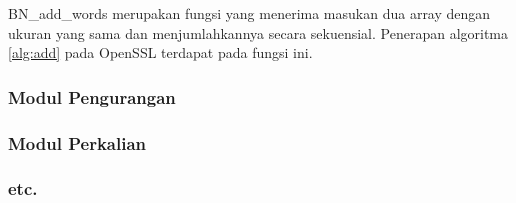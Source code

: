 BN\_add\_words merupakan fungsi yang menerima masukan dua array dengan ukuran yang sama dan menjumlahkannya secara sekuensial. Penerapan algoritma \ref{alg:add} pada OpenSSL terdapat pada fungsi ini.

%
%
%
%



\subsubsection{Modul Pengurangan}
\subsubsection{Modul Perkalian}
\subsubsection{etc.}
